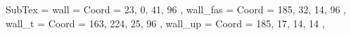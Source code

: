 SubTex = {
	wall								= { Coord = { 23, 0, 41, 96 } },
	wall_fas								= { Coord = { 185, 32, 14, 96 } },
	wall_t								= { Coord = { 163, 224, 25, 96 } },
	wall_up								= { Coord = { 185, 17, 14, 14 } },
}
